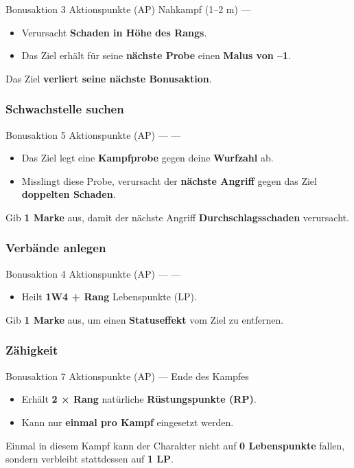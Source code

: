\skillcard
{}
{Bonusaktion}
{3 Aktionspunkte (AP)}
{Nahkampf (1--2 m)}
{—}
{
	\begin{itemize}
		\item Verursacht \textbf{Schaden in Höhe des Rangs}.
		\item Das Ziel erhält für seine \textbf{nächste Probe}
		einen \textbf{Malus von --1}.
	\end{itemize}
}
{
	Das Ziel \textbf{verliert seine nächste Bonusaktion}.
}


\subsubsection*{Schwachstelle suchen}

\skillcard
{}
{Bonusaktion}
{5 Aktionspunkte (AP)}
{—}
{—}
{
	\begin{itemize}
		\item Das Ziel legt eine \textbf{Kampfprobe} gegen deine
		\textbf{Wurfzahl} ab.
		\item Misslingt diese Probe, verursacht der
		\textbf{nächste Angriff} gegen das Ziel
		\textbf{doppelten Schaden}.
	\end{itemize}
}
{
	Gib \textbf{1 Marke} aus, damit der nächste Angriff
	\textbf{Durchschlagsschaden} verursacht.
}


\subsubsection*{Verbände anlegen}

\skillcard
{}
{Bonusaktion}
{4 Aktionspunkte (AP)}
{—}
{—}
{
	\begin{itemize}
		\item Heilt \textbf{1W4 + Rang} Lebenspunkte (LP).
	\end{itemize}
}
{
	Gib \textbf{1 Marke} aus, um einen
	\textbf{Statuseffekt} vom Ziel zu entfernen.
}


\subsubsection*{Zähigkeit}

\skillcard
{}
{Bonusaktion}
{7 Aktionspunkte (AP)}
{—}
{Ende des Kampfes}
{
	\begin{itemize}
		\item Erhält \textbf{2 × Rang} natürliche
		\textbf{Rüstungspunkte (RP)}.
		\item Kann nur \textbf{einmal pro Kampf} eingesetzt werden.
	\end{itemize}
}
{
	Einmal in diesem Kampf kann der Charakter
	nicht auf \textbf{0 Lebenspunkte} fallen,
	sondern verbleibt stattdessen auf \textbf{1 LP}.
}



